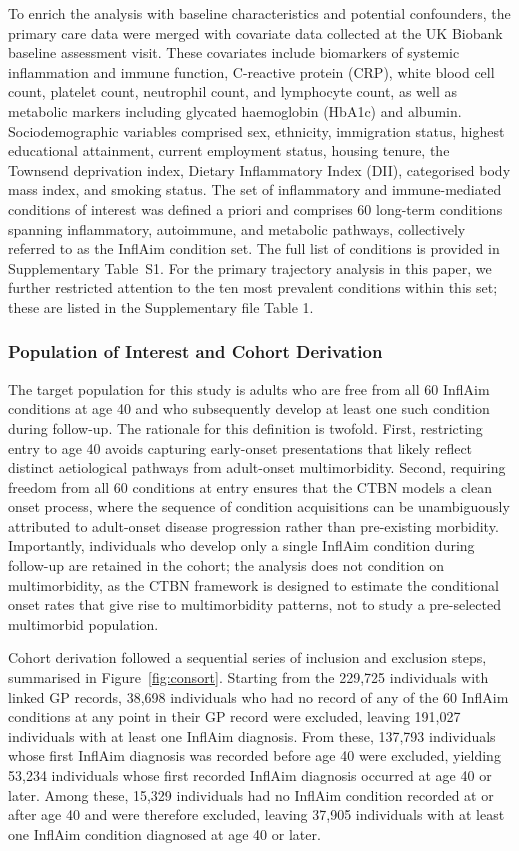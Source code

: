 \documentclass[12pt]{article}
\begin{document}
To enrich the analysis with baseline characteristics and potential confounders, the primary care data were merged with covariate data collected at the UK Biobank baseline assessment visit. These covariates include biomarkers of systemic inflammation and immune function, C-reactive protein (CRP), white blood cell count, platelet count, neutrophil count, and lymphocyte count, as well as metabolic markers including glycated haemoglobin (HbA1c) and albumin. Sociodemographic variables comprised sex, ethnicity, immigration status, highest educational attainment, current employment status, housing tenure, the Townsend deprivation index, Dietary Inflammatory Index (DII), categorised body mass index, and smoking status.
The set of inflammatory and immune-mediated conditions of interest was defined a priori and comprises 60 long-term conditions spanning inflammatory, autoimmune, and metabolic pathways, collectively referred to as the InflAim condition set. The full list of conditions is provided in Supplementary Table~S1. For the primary trajectory analysis in this paper, we further restricted attention to the ten most prevalent conditions within this set; these are listed in the Supplementary file Table 1. %

\subsubsection{Population of Interest and Cohort Derivation}

The target population for this study is adults who are free from all 60 InflAim conditions at age 40 and who subsequently develop at least one such condition during follow-up. The rationale for this definition is twofold. First, restricting entry to age 40 avoids capturing early-onset presentations that likely reflect distinct aetiological pathways from adult-onset multimorbidity. Second, requiring freedom from all 60 conditions at entry ensures that the CTBN models a clean onset process, where the sequence of condition acquisitions can be unambiguously attributed to adult-onset disease progression rather than pre-existing morbidity. Importantly, individuals who develop only a single InflAim condition during follow-up are retained in the cohort; the analysis does not condition on multimorbidity, as the CTBN framework is designed to estimate the conditional onset rates that give rise to multimorbidity patterns, not to study a pre-selected multimorbid population.

Cohort derivation followed a sequential series of inclusion and exclusion steps, summarised in Figure~\ref{fig:consort}. Starting from the 229,725 individuals with linked GP records, 38,698 individuals who had no record of any of the 60 InflAim conditions at any point in their GP record were excluded, leaving 191,027 individuals with at least one InflAim diagnosis. From these, 137,793 individuals whose first InflAim diagnosis was recorded before age 40 were excluded, yielding 53,234 individuals whose first recorded InflAim diagnosis occurred at age 40 or later. Among these, 15,329 individuals had no InflAim condition recorded at or after age 40 and were therefore excluded, leaving 37,905 individuals with at least one InflAim condition diagnosed at age 40 or later.
\end{document}
